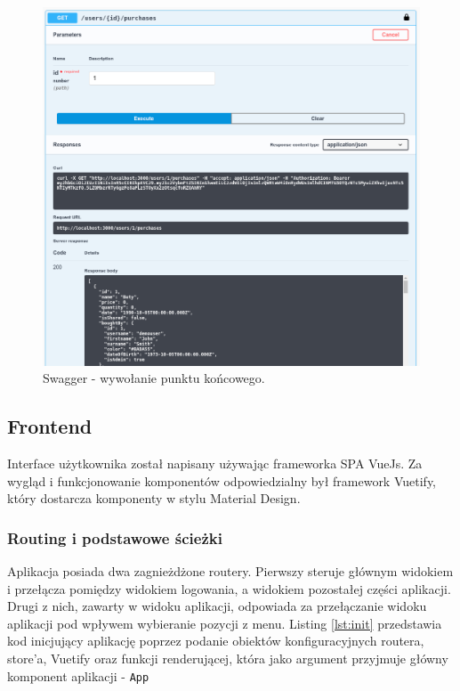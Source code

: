 \begin{figure}[H]
  \centering
  \includegraphics[keepaspectratio,
    width=\linewidth,
    height=\dimexpr\textheight-2\baselineskip]{screenshots/swagger_2.png}
  \caption{Swagger - wywołanie punktu końcowego.}
  \label{ss:swagger_query}

\end{figure}




\newpage
\subsection{Frontend}
Interface użytkownika został napisany używając frameworka SPA VueJs. Za wygląd i funkcjonowanie komponentów odpowiedzialny był framework Vuetify, który dostarcza komponenty w stylu Material Design.

\subsubsection{Routing i podstawowe ścieżki}

Aplikacja posiada dwa zagnieżdżone routery. Pierwszy steruje głównym widokiem i przełącza pomiędzy widokiem logowania, a widokiem pozostałej części aplikacji. Drugi z nich, zawarty w widoku aplikacji, odpowiada za przełączanie widoku aplikacji pod wpływem wybieranie pozycji z menu. Listing \ref{lst:init} przedstawia kod inicjujący aplikację poprzez podanie obiektów konfiguracyjnych routera, store'a, Vuetify oraz funkcji renderującej, która jako argument przyjmuje główny komponent aplikacji - \lstinline{App}


